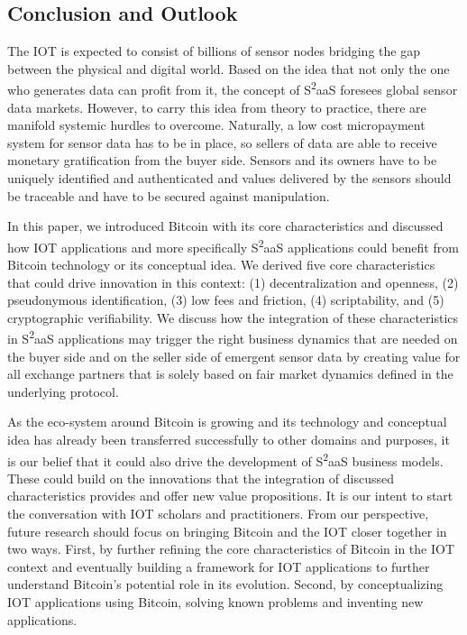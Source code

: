 \subsection{Conclusion and Outlook}

The IOT is expected to consist of billions of sensor nodes bridging the gap between the physical and digital world. Based on the idea that not only the one who generates data can profit from it, the concept of S\textsuperscript{2}aaS foresees global sensor data markets. However, to carry this idea from theory to practice, there are manifold systemic hurdles to overcome. Naturally, a low cost micropayment system for sensor data has to be in place, so sellers of data are able to receive monetary gratification from the buyer side. Sensors and its owners have to be uniquely identified and authenticated and values delivered by the sensors should be traceable and have to be secured against manipulation. 

In this paper, we introduced Bitcoin with its core characteristics and discussed how IOT applications and more specifically S\textsuperscript{2}aaS applications could benefit from Bitcoin technology or its conceptual idea. We derived five core characteristics that could drive innovation in this context: (1) decentralization and openness, (2) pseudonymous identification, (3) low fees and friction, (4) scriptability, and (5) cryptographic verifiability. We discuss how the integration of these characteristics in S\textsuperscript{2}aaS applications may trigger the right business dynamics that are needed on the buyer side and on the seller side of emergent sensor data by creating value for all exchange partners that is solely based on fair market dynamics defined in the underlying protocol. 

As the eco-system around Bitcoin is growing and its technology and conceptual idea has already been transferred successfully to other domains and purposes, it is our belief that it could also drive the development of S\textsuperscript{2}aaS business models. These could build on the innovations that the integration of discussed characteristics provides and offer new value propositions. It is our intent to start the conversation with IOT scholars and practitioners. From our perspective, future research should focus on bringing Bitcoin and the IOT closer together in two ways. First, by further refining the core characteristics of Bitcoin in the IOT context and eventually building a framework for IOT applications to further understand Bitcoin's potential role in its evolution. Second, by conceptualizing IOT applications using Bitcoin, solving known problems and inventing new applications.

